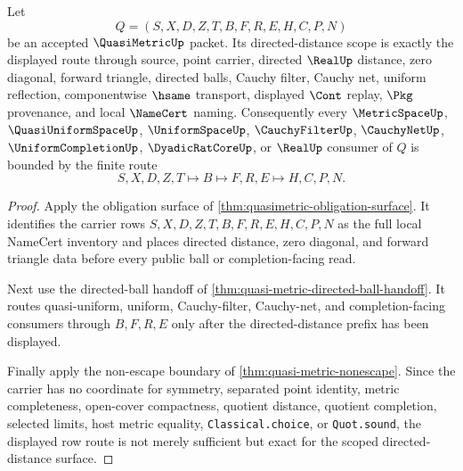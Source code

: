 \begin{theorem}
\label{thm:quasimetric-scope-tightening}
Let
$$
Q=(S,X,D,Z,T,B,F,R,E,H,C,P,N)
$$
be an accepted $\QuasiMetricUp$ packet. Its directed-distance scope is exactly the displayed route through source, point carrier, directed $\RealUp$ distance, zero diagonal, forward triangle, directed balls, Cauchy filter, Cauchy net, uniform reflection, componentwise $\hsame$ transport, displayed $\Cont$ replay, $\Pkg$ provenance, and local $\NameCert$ naming. Consequently every $\MetricSpaceUp$, $\QuasiUniformSpaceUp$, $\UniformSpaceUp$, $\CauchyFilterUp$, $\CauchyNetUp$, $\UniformCompletionUp$, $\DyadicRatCoreUp$, or $\RealUp$ consumer of $Q$ is bounded by the finite route
$$
S,X,D,Z,T \longmapsto B \longmapsto F,R,E \longmapsto H,C,P,N .
$$
\end{theorem}
\begin{proof}
Apply the obligation surface of \autoref{thm:quasimetric-obligation-surface}. It identifies the carrier rows $S,X,D,Z,T,B,F,R,E,H,C,P,N$ as the full local NameCert inventory and places directed distance, zero diagonal, and forward triangle data before every public ball or completion-facing read.

Next use the directed-ball handoff of \autoref{thm:quasi-metric-directed-ball-handoff}. It routes quasi-uniform, uniform, Cauchy-filter, Cauchy-net, and completion-facing consumers through $B,F,R,E$ only after the directed-distance prefix has been displayed.

Finally apply the non-escape boundary of \autoref{thm:quasi-metric-nonescape}. Since the carrier has no coordinate for symmetry, separated point identity, metric completeness, open-cover compactness, quotient distance, quotient completion, selected limits, host metric equality, \texttt{Classical.choice}, or \texttt{Quot.sound}, the displayed row route is not merely sufficient but exact for the scoped directed-distance surface.
\end{proof}

